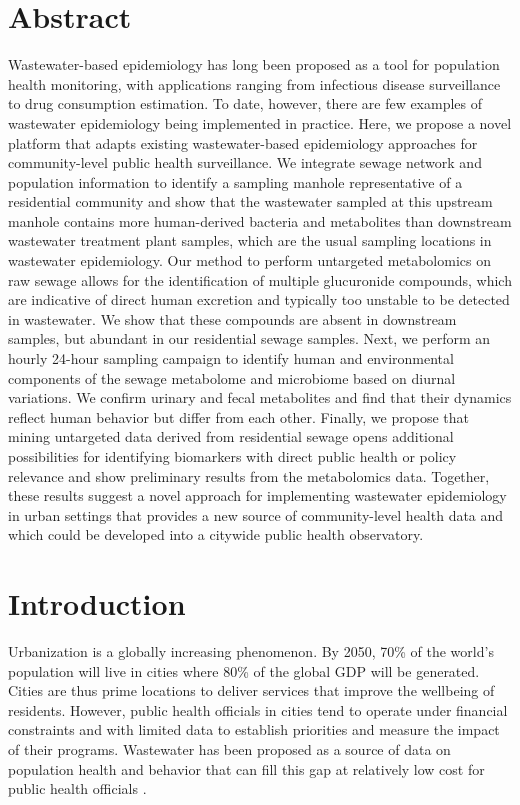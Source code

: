 
\section*{Abstract}

Wastewater-based epidemiology has long been proposed as a tool for population health monitoring, with applications ranging from infectious disease surveillance to drug consumption estimation. To date, however, there are few examples of wastewater epidemiology being implemented in practice. Here, we propose a novel platform that adapts existing wastewater-based epidemiology approaches for community-level public health surveillance. We integrate sewage network and population information to identify a sampling manhole representative of a residential community and show that the wastewater sampled at this upstream manhole contains more human-derived bacteria and metabolites than downstream wastewater treatment plant samples, which are the usual sampling locations in wastewater epidemiology. Our method to perform untargeted metabolomics on raw sewage allows for the identification of multiple glucuronide compounds, which are indicative of direct human excretion and typically too unstable to be detected in wastewater. We show that these compounds are absent in downstream samples, but abundant in our residential sewage samples. Next, we perform an hourly 24-hour sampling campaign to identify human and environmental components of the sewage metabolome and microbiome based on diurnal variations. We confirm urinary and fecal metabolites and find that their dynamics reflect human behavior but differ from each other. Finally, we propose that mining untargeted data derived from residential sewage opens additional possibilities for identifying biomarkers with direct public health or policy relevance and show preliminary results from the metabolomics data. Together, these results suggest a novel approach for implementing wastewater epidemiology in urban settings that provides a new source of community-level health data and which could be developed into a citywide public health observatory.

\section{Introduction}

Urbanization is a globally increasing phenomenon. By 2050, 70\% of the world's population will live in cities where 80\% of the global GDP will be generated. Cities are thus prime locations to deliver services that improve the wellbeing of residents. However, public health officials in cities tend to operate under financial constraints and with limited data to establish priorities and measure the impact of their programs. Wastewater has been proposed as a source of data on population health and behavior that can fill this gap at relatively low cost for public health officials \cite{Daughton2018}.

